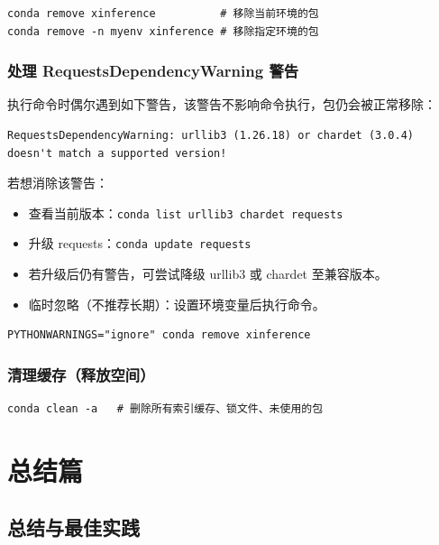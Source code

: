 \documentclass[12pt,UTF8]{ctexbook}
\begin{document}
\begin{lstlisting}
conda remove xinference          # 移除当前环境的包
conda remove -n myenv xinference # 移除指定环境的包
\end{lstlisting}

\section{处理 RequestsDependencyWarning 警告}
\label{sec:handle_warnings}

执行命令时偶尔遇到如下警告，该警告不影响命令执行，包仍会被正常移除：

\begin{lstlisting}
RequestsDependencyWarning: urllib3 (1.26.18) or chardet (3.0.4) doesn't match a supported version!
\end{lstlisting}

若想消除该警告：

\begin{itemize}[leftmargin=2cm]
    \item 查看当前版本：\texttt{conda list urllib3 chardet requests}
    \item 升级 requests：\texttt{conda update requests}
    \item 若升级后仍有警告，可尝试降级 urllib3 或 chardet 至兼容版本。
    \item 临时忽略（不推荐长期）：设置环境变量后执行命令。
\end{itemize}

\begin{lstlisting}
PYTHONWARNINGS="ignore" conda remove xinference
\end{lstlisting}

\section{清理缓存（释放空间）}
\label{sec:clean_cache}

\begin{lstlisting}
conda clean -a   # 删除所有索引缓存、锁文件、未使用的包
\end{lstlisting}

\part{总结篇}

\chapter{总结与最佳实践}
\label{chap:summary}
\end{document}

